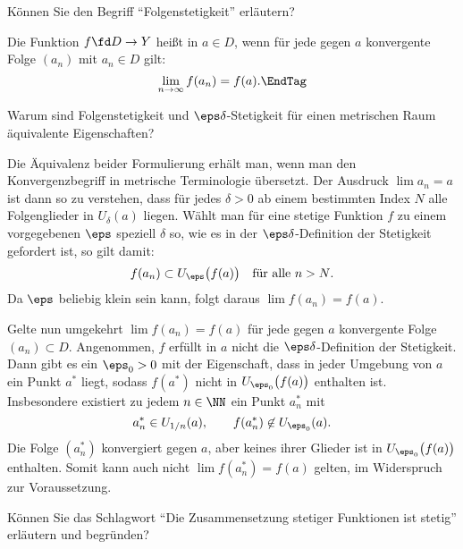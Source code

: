 \begin{frage}
  Können Sie den Begriff "`Folgenstetigkeit"' erläutern? 
\end{frage}

\begin{antwort}
  Die Funktion $f\fd D\to Y$ heißt  
  in $a\in D$, wenn für jede gegen $a$ konvergente  
  Folge $(a_n)$ mit $a_n \in D$ gilt: 
  \[
  \lim_{n\to\infty} f(a_n)=f(a).   \EndTag
  \]
\end{antwort}

\begin{frage}
  Warum sind Folgenstetigkeit und $\eps\delta$-Stetigkeit 
  für einen metrischen Raum äquivalente Eigenschaften? 
\end{frage}

\begin{antwort} 
  Die Äquivalenz beider Formulierung erhält man, wenn man den 
  Konvergenzbegriff in metrische Terminologie übersetzt. 
  Der Ausdruck $\lim a_n = a $ ist dann so zu verstehen, dass für jedes 
  $\delta>0$ ab einem bestimmten Index $N$ alle Folgenglieder in 
  $U_\delta(a)$ liegen. Wählt man für eine stetige Funktion $f$ zu 
  einem vorgegebenen $\eps$ speziell $\delta$ so, 
  wie es in der $\eps\delta$-Definition der 
  Stetigkeit gefordert ist, so gilt damit:
  \[
  f(a_n) \subset U_\eps\big( f(a) \big) \quad \text{für alle $n>N$}. 
  \]
  Da $\eps$ beliebig klein sein kann, folgt daraus 
  $\lim f(a_n) = f(a)$. 

  Gelte nun umgekehrt $\lim f(a_n)=f(a)$ für jede 
  gegen $a$ konvergente Folge $(a_n)\subset D$. 
  Angenommen, $f$ erfüllt in $a$ 
  nicht die $\eps\delta$-Definition der Stetigkeit. 
  Dann gibt es ein $\eps_0>0$ mit der Eigenschaft, dass in jeder 
  Umgebung von $a$ ein Punkt $a^*$ liegt, sodass $f(a^*)$ nicht 
  in $U_{\eps_0}\big( f(a) \big)$ enthalten ist. Insbesondere 
  existiert zu jedem $n\in\NN$ ein Punkt $a_n^*$ mit 
  \[
  a^*_n \in U_{1/n}(a), \qquad 
  f(a^*_n) \not \in U_{\eps_0}( a ).
  \]
  Die Folge $(a^*_n)$ konvergiert gegen $a$, aber keines 
  ihrer Glieder ist in $U_{\eps_0}\big( f(a) \big)$ enthalten. 
  Somit kann auch nicht 
  $\lim f(a^*_n) = f(a)$ gelten, im Widerspruch zur Voraussetzung. 
  \AntEnd
\end{antwort}

\begin{frage}\label{09_zusammensetzung}
  Können Sie das Schlagwort "`Die Zusammensetzung stetiger Funktionen 
  ist stetig"' erläutern und begründen?
\end{frage}

